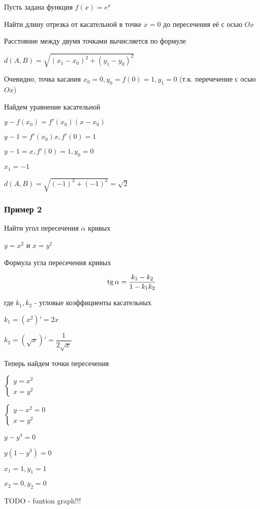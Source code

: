 Пусть задана функция $ f(x) = e^{x} $

Найти длину отрезка от касательной в точке $ x = 0 $ до пересечения её с осью $ Ox $

Расстояние между двумя точками вычисляется по формуле

$ d(A,B) = \sqrt{(x_{1} - x_{0})^{2} + (y_{1} - y_{0})^{2}} $

Очевидно, точка касания $ x_0 = 0, y_0 = f(0) = 1, y_1 = 0 $ (т.к. перечечение с осью $ Ox $)

Найдем уравнение касательной

$ y - f(x_0) = f'(x_0)(x - x_0) $

$ y - 1 = f'(x_0)x, f'(0) = 1 $

$ y - 1 = x, f'(0) = 1, y_0 = 0 $

$ x_1 = -1 $

$ d(A,B) = \sqrt{(-1)^{2} + (-1)^{2}} = \sqrt{2}$

\subsubsection{Пример 2}

Найти угол пересечения $ \alpha $ кривых

$ y = x^{2} $ и $ x = y^{2} $

Формула угла пересечения кривых

$$
\operatorname{tg} \alpha = \dfrac{k_{1} - k_{2}}{1 - k_{1}k_{2}} \label{functions_angle}
$$

где $ k_1, k_2 $ - угловые коэффициенты касательных

$ k_1 = (x^{2})' = 2x $

$ k_2 = (\sqrt{x})' = \dfrac{1}{2 \sqrt{x}} $

Теперь найдем точки пересечения


$\begin{cases}
 y = x^{2} \\
 x = y^{2}
\end{cases}$

$\begin{cases}
 y - x^{2} = 0 \\
 x = y^{2}
\end{cases}$

$ y - y^{4} = 0 $

$ y(1 - y^{3}) = 0 $

$ x_1 = 1, y_1 = 1 $

$ x_2 = 0, y_2 = 0 $

TODO - funtion graph!!!

